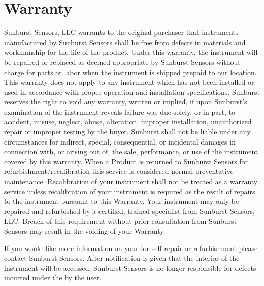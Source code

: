 \section*{Warranty}
\label{sec:Warranty}

\begin{sans}

Sunburst Sensors, LLC warrants to the original purchaser that instruments manufactured by Sunburst Sensors shall be free from defects in materials and workmanship for the life of the product. Under this warranty, the instrument will be repaired or replaced as deemed appropriate by Sunburst Sensors without charge for parts or labor when the instrument is shipped prepaid to our location. This warranty does not apply to any instrument which has not been installed or used in accordance with proper operation and installation specifications. Sunburst reserves the right to void any warranty, written or implied, if upon Sunburst's examination of the instrument reveals failure was due solely, or in part, to accident, misuse, neglect, abuse, alteration, improper installation, unauthorized repair or improper testing by the buyer. Sunburst shall not be liable under any circumstances for indirect, special, consequential, or incidental damages in connection with, or arising out of, the sale, performance, or use of the instrument covered by this warranty. When a Product is returned to Sunburst Sensors for refurbishment/recalibration this service is considered normal preventative maintenance. Recalibration of your instrument shall not be treated as a warranty service unless recalibration of your instrument is required as the result of repairs to the instrument pursuant to this Warranty. Your instrument may only be repaired and refurbished by a certified, trained specialist from Sunburst Sensors, LLC. Breach of this requirement without prior consultation from Sunburst Sensors may result in the voiding of your Warranty. 

If you would like more information on your \instType{} for self-repair or refurbishment please contact Sunburst Sensors. After notification is given that the interior of the instrument will be accessed, Sunburst Sensors is no longer responsible for defects incurred under the by the user.

\end{sans}